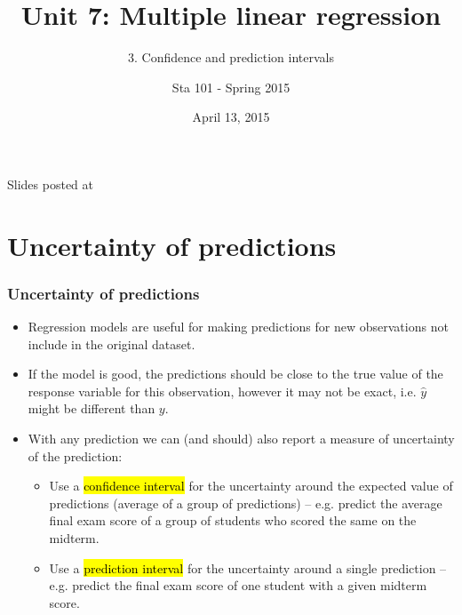 \documentclass[slidestop,compress,mathserif,12pt,t,professionalfonts,xcolor=table]{beamer}
\title{Unit 7: Multiple linear regression}
\subtitle{3. Confidence and prediction intervals}
\author{Sta 101 - Spring 2015}
\date{April 13, 2015}
\institute{Duke University, Department of Statistical Science}
\begin{document}


\begin{frame}[plain]

\titlepage
\vfill
{\scriptsize {} \hfill Slides posted at  \webLink{\CourseSite}{\CourseSite}}
\addtocounter{framenumber}{-1} 

\end{frame}


%
%
%
%
%
%
%

\section{Uncertainty of predictions}


\begin{frame}
\frametitle{Uncertainty of predictions}

\begin{itemize}

\item Regression models are useful for making predictions for new observations not include in the original dataset.

\pause

\item If the model is good, the predictions should be close to the true value of the response variable for this observation, however it may not be exact, i.e. $\hat{y}$ might be different than $y$.

\pause

\item With any prediction we can (and should) also report a measure of uncertainty of the prediction:
\begin{itemize}
\item Use a \hl{confidence interval} for the uncertainty around the expected value of predictions (average of a group of predictions) -- e.g. predict the average final exam score of a group of students who scored the same on the midterm.
\item Use a \hl{prediction interval} for the uncertainty around a single prediction -- e.g. predict the final exam score of one student with a given midterm score.
\end{itemize}

\end{itemize}

\end{frame}
\end{document}
